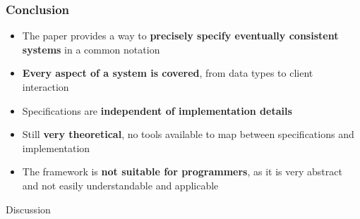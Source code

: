 \documentclass[11pt]{beamer}
\begin{document}
\begin{frame}
\frametitle{Conclusion}
\begin{itemize}
\item<pro@1-> The paper provides a way to \textbf{precisely specify eventually consistent systems} in a common notation
\item<pro@1-> \textbf{Every aspect of a system is covered}, from data types to client interaction
\item<pro@1-> Specifications are \textbf{independent of implementation details}
\item<con@1-> Still \textbf{very theoretical}, no tools available to map between specifications and implementation 
\item<con@1-> The framework is \textbf{not suitable for programmers}, as it is very abstract and not easily understandable and applicable
\end{itemize}
\end{frame}

\begin{frame}
\begin{center}
\begin{Huge}
Discussion
\end{Huge}
\end{center}
\end{frame}
\end{document}
